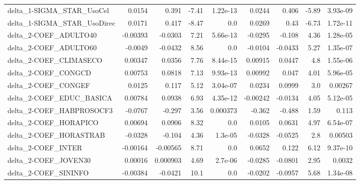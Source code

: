 \begin{tabular}{lrrrrrrrr}
delta\_1-SIGMA\_STAR\_UsoCel              &      0.0154 &        0.391 &    -7.41 & 1.22e-13 &     0.0244 &       0.406 &        -5.89 &      3.93e-09 \\
delta\_1-SIGMA\_STAR\_UsoDirec            &      0.0171 &        0.417 &    -8.47 &      0.0 &     0.0269 &        0.43 &        -6.73 &      1.72e-11 \\
delta\_2-COEF\_ADULTO40                  &    -0.00393 &      -0.0303 &     7.21 & 5.66e-13 &    -0.0295 &      -0.108 &         4.36 &      1.28e-05 \\
delta\_2-COEF\_ADULTO60                  &     -0.0049 &      -0.0432 &     8.56 &      0.0 &    -0.0104 &     -0.0433 &         5.27 &      1.35e-07 \\
delta\_2-COEF\_CLIMASECO                 &     0.00347 &       0.0356 &     7.76 & 8.44e-15 &    0.00915 &      0.0447 &          4.8 &      1.55e-06 \\
delta\_2-COEF\_CONGCD                    &     0.00753 &       0.0818 &     7.13 & 9.93e-13 &    0.00992 &       0.047 &         4.01 &      5.96e-05 \\
delta\_2-COEF\_CONGEF                    &      0.0125 &        0.117 &     5.12 & 3.04e-07 &     0.0234 &      0.0999 &          3.0 &       0.00267 \\
delta\_2-COEF\_EDUC\_BASICA               &     0.00784 &       0.0938 &     6.93 & 4.35e-12 &   -0.00242 &     -0.0134 &         4.05 &      5.12e-05 \\
delta\_2-COEF\_HABPROSOCF3               &     -0.0767 &       -0.297 &     3.56 & 0.000373 &     -0.362 &      -0.488 &         1.59 &         0.113 \\
delta\_2-COEF\_HORAPICO                  &     0.00694 &       0.0906 &     8.32 &      0.0 &     0.0105 &      0.0631 &         4.97 &      6.54e-07 \\
delta\_2-COEF\_HORASTRAB                 &     -0.0328 &       -0.104 &     4.36 &  1.3e-05 &    -0.0328 &     -0.0525 &          2.8 &       0.00503 \\
delta\_2-COEF\_INTER                     &    -0.00164 &     -0.00565 &     8.71 &      0.0 &     0.0652 &       0.122 &         6.12 &      9.37e-10 \\
delta\_2-COEF\_JOVEN30                   &     0.00016 &     0.000903 &     4.69 &  2.7e-06 &    -0.0285 &     -0.0801 &         2.95 &        0.0032 \\
delta\_2-COEF\_SININFO                   &    -0.00384 &      -0.0421 &     10.1 &      0.0 &    -0.0202 &     -0.0957 &         5.68 &      1.34e-08 \\

\end{tabular}
